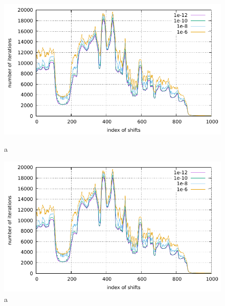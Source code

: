 \begin{figure}[H]
	\begin{center}
		\begin{minipage}[t]{0.49\columnwidth}
			\centering
			\includegraphics[scale=1.5]{./fig/compare-inner.pdf}
			\caption{a}
			\label{fig-3}
		\end{minipage}
		\begin{minipage}[t]{0.49\columnwidth}
			\centering
			\includegraphics[scale=1.5]{./fig/compare-inner.pdf}
			\caption{a}
			\label{fig-4}
		\end{minipage}
	\end{center}
\end{figure}